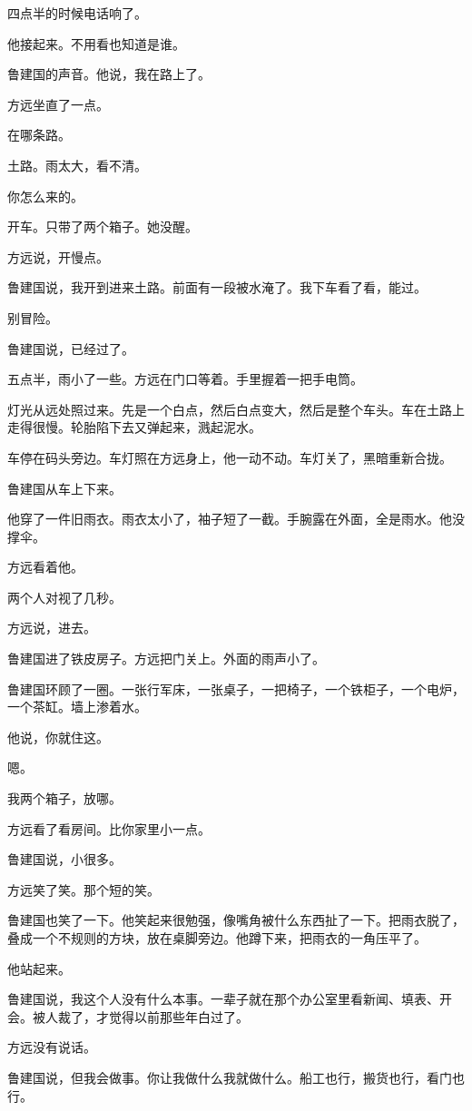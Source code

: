 \documentclass[UTF8,a5paper,11pt,openany]{ctexbook}
\begin{document}
四点半的时候电话响了。

他接起来。不用看也知道是谁。

鲁建国的声音。他说，我在路上了。

方远坐直了一点。

在哪条路。

土路。雨太大，看不清。

你怎么来的。

开车。只带了两个箱子。她没醒。

方远说，开慢点。

鲁建国说，我开到进来土路。前面有一段被水淹了。我下车看了看，能过。

别冒险。

鲁建国说，已经过了。

五点半，雨小了一些。方远在门口等着。手里握着一把手电筒。

灯光从远处照过来。先是一个白点，然后白点变大，然后是整个车头。车在土路上走得很慢。轮胎陷下去又弹起来，溅起泥水。

车停在码头旁边。车灯照在方远身上，他一动不动。车灯关了，黑暗重新合拢。

鲁建国从车上下来。

他穿了一件旧雨衣。雨衣太小了，袖子短了一截。手腕露在外面，全是雨水。他没撑伞。

方远看着他。

两个人对视了几秒。

方远说，进去。

鲁建国进了铁皮房子。方远把门关上。外面的雨声小了。

鲁建国环顾了一圈。一张行军床，一张桌子，一把椅子，一个铁柜子，一个电炉，一个茶缸。墙上渗着水。

他说，你就住这。

嗯。

我两个箱子，放哪。

方远看了看房间。比你家里小一点。

鲁建国说，小很多。

方远笑了笑。那个短的笑。

鲁建国也笑了一下。他笑起来很勉强，像嘴角被什么东西扯了一下。把雨衣脱了，叠成一个不规则的方块，放在桌脚旁边。他蹲下来，把雨衣的一角压平了。

他站起来。

鲁建国说，我这个人没有什么本事。一辈子就在那个办公室里看新闻、填表、开会。被人裁了，才觉得以前那些年白过了。

方远没有说话。

鲁建国说，但我会做事。你让我做什么我就做什么。船工也行，搬货也行，看门也行。
\end{document}
